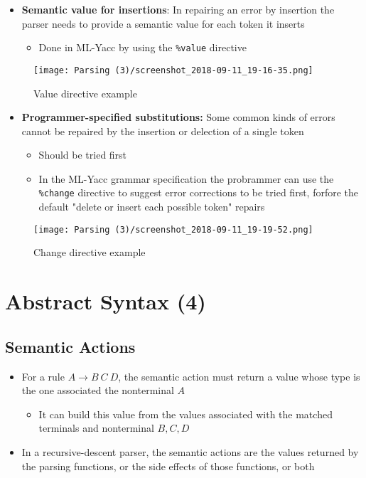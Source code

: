 \documentclass[11pt]{article}
\begin{document}
\begin{itemize}
\item \textbf{Semantic value for insertions}: In repairing an error by insertion the parser needs to provide a semantic value for each token it inserts
\begin{itemize}
\item Done in ML-Yacc by using the \texttt{\%value} directive
\end{itemize}
\end{itemize}

\begin{figure}[htbp]
\centering
\texttt{[image: Parsing (3)/screenshot\_2018-09-11\_19-16-35.png]}
\caption{\label{fig:org4bd403f}
Value directive example}
\end{figure}

\begin{itemize}
\item \textbf{Programmer-specified substitutions:} Some common kinds of errors cannot be repaired by the insertion or delection of a single token
\begin{itemize}
\item Should be tried first
\item In the ML-Yacc grammar specification the probrammer can use the \texttt{\%change} directive to suggest error corrections to be tried first, forfore the default "delete or insert each possible token" repairs
\end{itemize}
\end{itemize}

\begin{figure}[htbp]
\centering
\texttt{[image: Parsing (3)/screenshot\_2018-09-11\_19-19-52.png]}
\caption{\label{fig:org6816299}
Change directive example}
\end{figure}

\section{Abstract Syntax (4)}
\label{sec:org21547af}
\subsection{Semantic Actions}
\label{sec:orgb100ce7}
\begin{itemize}
\item For a rule \(A \to B \ C \ D\), the semantic action must return a value whose type is the one associated the nonterminal \(A\)
\begin{itemize}
\item It can build this value from the values associated with the matched terminals and nonterminal \(B,C,D\)
\end{itemize}

\item In a recursive-descent parser, the semantic actions are the values returned by the parsing functions, or the side effects of those functions, or both
\end{itemize}
\end{document}
